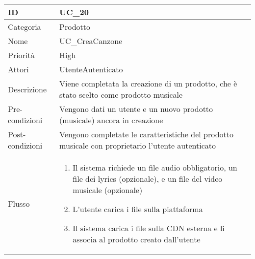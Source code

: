 \begin{center}
\begin{tabular}{ |p{2cm}|p{13cm}|  }
\hline
ID & UC\_20\\\hline
Categoria & Prodotto \\\hline
Nome & UC\_CreaCanzone \\\hline
Priorità & High \\\hline
Attori &  UtenteAutenticato \\\hline
Descrizione & Viene completata la creazione di un prodotto, che è stato scelto come prodotto musicale\\\hline
Pre-condizioni &   Vengono dati un utente e un nuovo prodotto (musicale) ancora in creazione\\\hline
Post-condizioni &  Vengono completate le caratteristiche del prodotto musicale con proprietario l'utente autenticato\\\hline
Flusso &  	\begin{enumerate}
			\item Il sistema richiede un file audio obbligatorio, un file dei lyrics (opzionale), e un file del video musicale (opzionale)
			\item L'utente carica i file sulla piattaforma
			\item Il sistema carica i file sulla CDN esterna e li associa al prodotto creato dall'utente
		\end{enumerate}\\\hline
\end{tabular}
\label{table_use_case:20}\newline


\end{center}
